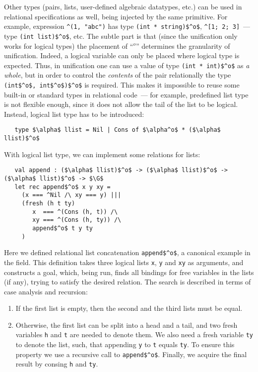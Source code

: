 Other types (pairs, lists, user-defined algebraic datatypes, etc.) can be used in relational specifications as well, being injected by the same primitive. For example, expression \lstinline{^(1, "abc")} has type \lstinline{(int * string)$^o$}, \lstinline{^[1; 2; 3]}~--- type \lstinline{(int list)$^o$}, etc. The subtle part is that (since the unification only works for logical types) the placement of ``$^o$'' determines the granularity of unification. Indeed, a logical variable can only be placed where logical type is expected. Thus, in unification one can use a value of type \lstinline{(int * int)$^o$} as \emph{a whole}, but in order to control the \emph{contents} of the pair relationally the type \lstinline{(int$^o$, int$^o$)$^o$} is required. This makes it impossible to reuse some built-in or standard types in relational code~--- for example, predefined list type is not flexible enough, since it does not allow the tail of the list to be logical. Instead, logical list type has to be introduced:

\begin{lstlisting}
   type $\alpha$ llist = Nil | Cons of $\alpha^o$ * ($\alpha$ llist)$^o$
\end{lstlisting}

With logical list type, we can implement some relations for lists:

\begin{lstlisting}
   val append : ($\alpha$ llist)$^o$ -> ($\alpha$ llist)$^o$ -> ($\alpha$ llist)$^o$ -> $\G$
   let rec append$^o$ x y xy =
     (x === ^Nil /\ xy === y) |||
     (fresh (h t ty)
        x  === ^(Cons (h, t)) /\
        xy === ^(Cons (h, ty)) /\
        append$^o$ t y ty
     ) 
\end{lstlisting}

Here we defined relational list concatenation \lstinline{append$^o$}, a canonical example in the field. This definition takes three logical lists \lstinline{x}, \lstinline{y} and \lstinline{xy} as arguments, and constructs a goal, which, being run, finds all bindings for free variables in the lists (if any), trying to satisfy the desired relation. The search is described in terms of case analysis and recursion:

\begin{enumerate}
\item If the first list is empty, then the second and the third lists must be equal.
\item Otherwise, the first list can be split into a head and a tail, and two fresh variables \lstinline{h} and \lstinline{t} are needed to denote them. We also need a fresh variable \lstinline{ty} to denote the list, such, that appending \lstinline{y} to \lstinline{t} equals \lstinline{ty}. To ensure this property we use a recursive call to \lstinline{append$^o$}. Finally, we acquire the final result by consing \lstinline{h} and \lstinline{ty}. 
\end{enumerate}


